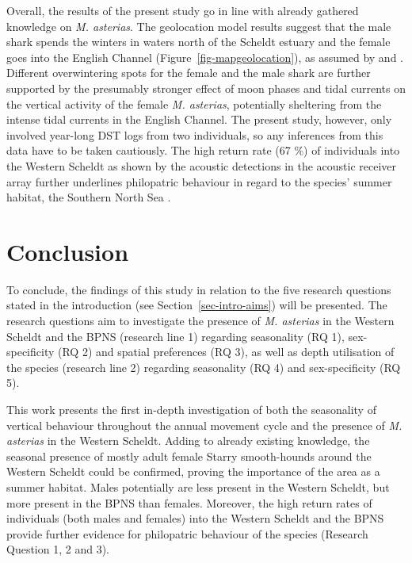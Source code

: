 \documentclass[
  authoryear,
  review,
  3p]{elsarticle}
\begin{document}
Overall, the results of the present study go in line with already
gathered knowledge on \emph{M. asterias}. The geolocation model results
suggest that the male shark spends the winters in waters north of the
Scheldt estuary and the female goes into the English Channel
(Figure~\ref{fig-mapgeolocation}), as assumed by \citet{breve_2020} and
\citet{griffiths_2020}. Different overwintering spots for the female and
the male shark are further supported by the presumably stronger effect
of moon phases and tidal currents on the vertical activity of the female
\emph{M. asterias}, potentially sheltering from the intense tidal
currents in the English Channel. The present study, however, only
involved year-long DST logs from two individuals, so any inferences from
this data have to be taken cautiously. The high return rate (67 \%) of
individuals into the Western Scheldt as shown by the acoustic detections
in the acoustic receiver array further underlines philopatric behaviour
in regard to the species' summer habitat, the Southern North Sea
\citep{breve_2016, breve_2020, griffiths_2020}.

\hypertarget{conclusion}{%
\section{Conclusion}\label{conclusion}}

To conclude, the findings of this study in relation to the five research
questions stated in the introduction (see Section~\ref{sec-intro-aims})
will be presented. The research questions aim to investigate the
presence of \emph{M. asterias} in the Western Scheldt and the BPNS
(research line 1) regarding seasonality (RQ 1), sex-specificity (RQ 2)
and spatial preferences (RQ 3), as well as depth utilisation of the
species (research line 2) regarding seasonality (RQ 4) and
sex-specificity (RQ 5).

This work presents the first in-depth investigation of both the
seasonality of vertical behaviour throughout the annual movement cycle
and the presence of \emph{M. asterias} in the Western Scheldt. Adding to
already existing knowledge, the seasonal presence of mostly adult female
Starry smooth-hounds around the Western Scheldt could be confirmed,
proving the importance of the area as a summer habitat. Males
potentially are less present in the Western Scheldt, but more present in
the BPNS than females. Moreover, the high return rates of individuals
(both males and females) into the Western Scheldt and the BPNS provide
further evidence for philopatric behaviour of the species (Research
Question 1, 2 and 3).
\end{document}
